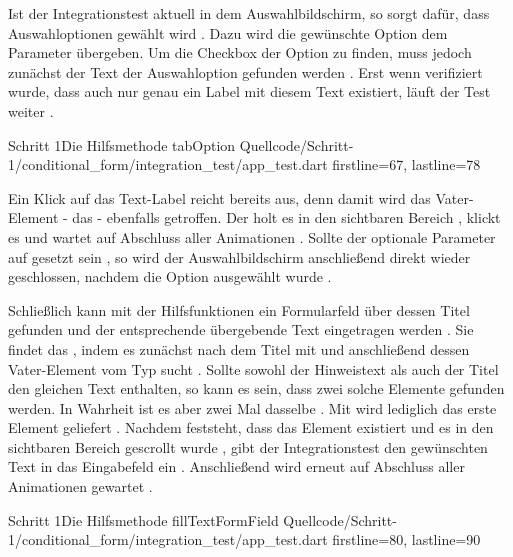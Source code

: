 Ist der Integrationstest aktuell in dem Auswahlbildschirm, so sorgt  dafür, dass Auswahloptionen gewählt wird \Lst{\ref{lst:Schritt1HilfsmethodeTabOption}}. Dazu wird die gewünschte Option dem Parameter  übergeben. Um die Checkbox der Option zu finden, muss jedoch zunächst der Text der Auswahloption gefunden werden . Erst wenn verifiziert wurde, dass auch nur genau ein Label mit diesem Text existiert, läuft der Test weiter . 

\begin{alexlisting}{Schritt 1}{Die Hilfsmethode tabOption}
  {Quellcode/Schritt-1/conditional_form/integration_test/app_test.dart}
  {firstline=67, lastline=78}
  \label{lst:Schritt1HilfsmethodeTabOption}
\end{alexlisting}

Ein Klick auf das Text-Label reicht bereits aus, denn damit wird das Vater-Element - das  - ebenfalls getroffen. Der  holt es in den sichtbaren Bereich , klickt es  und wartet auf Abschluss aller Animationen . Sollte der optionale Parameter  auf  gesetzt sein , so wird der Auswahlbildschirm anschließend direkt wieder geschlossen, nachdem die Option ausgewählt wurde  . 

Schließlich kann mit der Hilfsfunktionen  ein Formularfeld über dessen Titel gefunden und der entsprechende übergebende Text eingetragen werden \Lst{\label{lst:Schritt1HilfsmethodeFillTextFormField}}. Sie findet das , indem es zunächst nach dem Titel mit  und anschließend dessen Vater-Element vom Typ  sucht . Sollte sowohl der Hinweistext als auch der Titel den gleichen Text enthalten, so kann es sein, dass zwei solche Elemente gefunden werden. In Wahrheit ist es aber zwei Mal dasselbe . Mit  wird lediglich das erste Element geliefert .
Nachdem feststeht, dass das Element existiert  und es in den sichtbaren Bereich gescrollt wurde , gibt der Integrationstest den gewünschten Text in das Eingabefeld ein . Anschließend wird erneut auf Abschluss aller Animationen gewartet .

\begin{alexlisting}{Schritt 1}{Die Hilfsmethode fillTextFormField}
  {Quellcode/Schritt-1/conditional_form/integration_test/app_test.dart}
  {firstline=80, lastline=90}
  \label{lst:Schritt1HilfsmethodeFillTextFormField}
\end{alexlisting}







